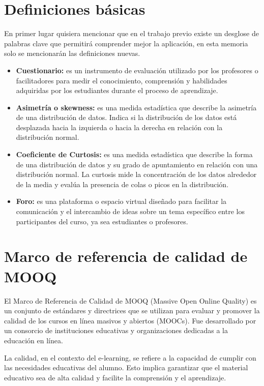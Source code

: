 

\section{Definiciones básicas}

En primer lugar quisiera mencionar que en el trabajo previo existe un desglose de palabras clave que permitirá comprender mejor la aplicación, en esta memoria solo se mencionarán las definiciones nuevas.

\begin{itemize}
	\item \textbf{Cuestionario:} es un instrumento de evaluación utilizado por los profesores o facilitadores para medir el conocimiento, comprensión y habilidades adquiridas por los estudiantes durante el proceso de aprendizaje\cite{Lissette}.
	\item \textbf{Asimetría o skewness:} es una medida estadística que describe la asimetría de una distribución de datos. Indica si la distribución de los datos está desplazada hacia la izquierda o hacia la derecha en relación con la distribución normal.
	\item \textbf{Coeficiente de Curtosis:} es una medida estadística que describe la forma de una distribución de datos y su grado de apuntamiento en relación con una distribución normal. La curtosis mide la concentración de los datos alrededor de la media y evalúa la presencia de colas o picos en la distribución. 
	\item \textbf{Foro:} es una plataforma o espacio virtual diseñado para facilitar la comunicación y el intercambio de ideas sobre un tema específico entre los participantes del curso, ya sea estudiantes o profesores.  
\end{itemize}


\section{Marco de referencia de calidad de MOOQ}
El Marco de Referencia de Calidad de MOOQ (Massive Open Online Quality) es un conjunto de estándares y directrices que se utilizan para evaluar y promover la calidad de los cursos en línea masivos y abiertos (MOOCs). Fue desarrollado por un consorcio de instituciones educativas y organizaciones dedicadas a la educación en línea\cite{stracke2018quality}.

La calidad, en el contexto del e-learning, se refiere a la capacidad de cumplir con las necesidades educativas del alumno. Esto implica garantizar que el material educativo sea de alta calidad y facilite la comprensión y el aprendizaje.

